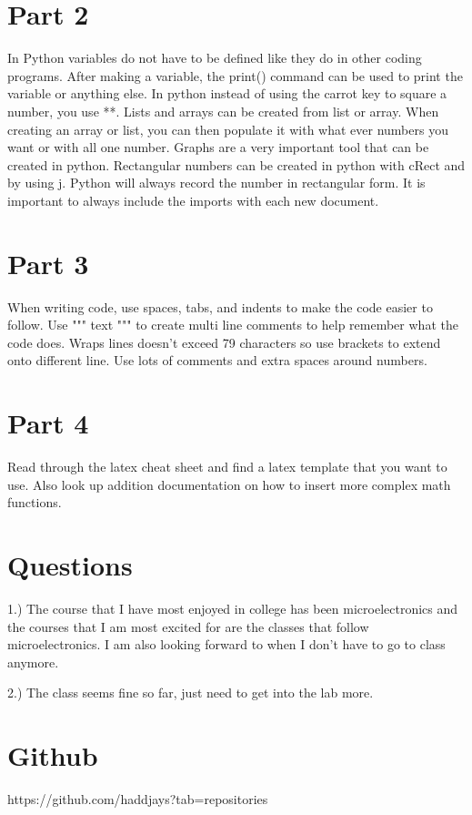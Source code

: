 \documentclass[11pt,a4]{report}
\begin{document}
\section{Part 2}
In Python variables do not have to be defined like they do in other coding programs. After making a variable, the print() command can be used to print the variable or anything else. In python instead of using the carrot key to square a number, you use **. Lists and arrays can be created from list or array. When creating an array or list, you can then populate it with what ever numbers you want or with all one number. Graphs are a very important tool that can be created in python. Rectangular numbers can be created in python with cRect and by using j. Python will always record the number in rectangular form. It is important to always include the imports with each new document. 

\section{Part 3}
When writing code, use spaces, tabs, and indents to make the code easier to follow. Use """ text """ to create multi line comments to help remember what the code does. Wraps lines doesn't exceed 79 characters so use brackets to extend onto different line. Use lots of comments and extra spaces around numbers. 
\section{Part 4}
Read through the latex cheat sheet and find a latex template that you want to use. Also look up addition documentation on how to insert more complex math functions. 

\section{Questions}
1.) The course that I have most enjoyed in college has been microelectronics and the courses that I am most excited for are the classes that follow microelectronics. I am also looking forward to when I don't have to go to class anymore. 

2.) The class seems fine so far, just need to get into the lab more. 
\section{Github}
https://github.com/haddjays?tab=repositories
\end{document}
